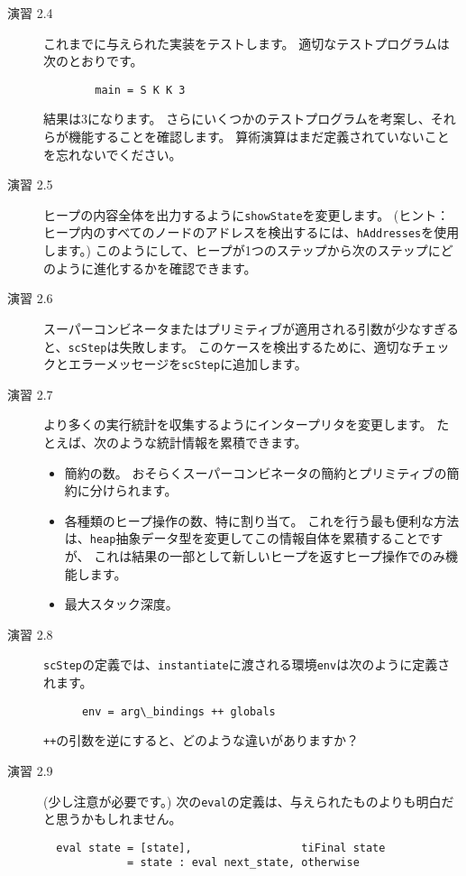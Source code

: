 \documentclass{jarticle}
\begin{document}
\begin{description}
	\item [演習 2.4] これまでに与えられた実装をテストします。
	      適切なテストプログラムは次のとおりです。

	      \begin{verbatim}
        main = S K K 3
\end{verbatim}

	      結果は3になります。
	      さらにいくつかのテストプログラムを考案し、それらが機能することを確認します。
	      算術演算はまだ定義されていないことを忘れないでください。
	\item [演習 2.5] ヒープの内容全体を出力するように\texttt{showState}を変更します。
	      (ヒント：ヒープ内のすべてのノードのアドレスを検出するには、\texttt{hAddresses}を使用します。)
	      このようにして、ヒープが1つのステップから次のステップにどのように進化するかを確認できます。
	\item [演習 2.6] スーパーコンビネータまたはプリミティブが適用される引数が少なすぎると、\texttt{scStep}は失敗します。
	      このケースを検出するために、適切なチェックとエラーメッセージを\texttt{scStep}に追加します。
	\item [演習 2.7] より多くの実行統計を収集するようにインタープリタを変更します。
	      たとえば、次のような統計情報を累積できます。

	      \begin{itemize}
		      \item 簡約の数。
		            おそらくスーパーコンビネータの簡約とプリミティブの簡約に分けられます。
		      \item 各種類のヒープ操作の数、特に割り当て。
		            これを行う最も便利な方法は、\texttt{heap}抽象データ型を変更してこの情報自体を累積することですが、
		            これは結果の一部として新しいヒープを返すヒープ操作でのみ機能します。
		      \item 最大スタック深度。
	      \end{itemize}

	\item [演習 2.8] \texttt{scStep}の定義では、\texttt{instantiate}に渡される環境\texttt{env}は次のように定義されます。

	      \begin{verbatim}
      env = arg\_bindings ++ globals
\end{verbatim}

	      \texttt{++}の引数を逆にすると、どのような違いがありますか？
	\item [演習 2.9] (少し注意が必要です。)
	      次の\texttt{eval}の定義は、与えられたものよりも明白だと思うかもしれません。
	      \begin{verbatim}
  eval state = [state],                 tiFinal state
             = state : eval next_state, otherwise
\end{verbatim}


\end{description}
\end{document}
